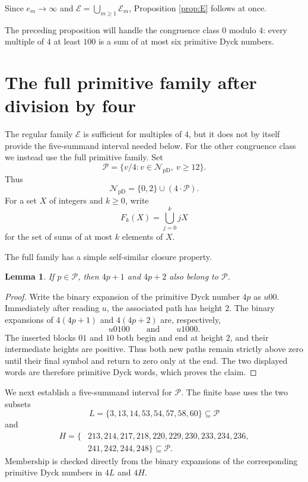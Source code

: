 \documentclass[12pt]{article}
\theoremstyle{plain}
\newtheorem{lemma}[theorem]{Lemma}
\newcommand{\NpD}{\mathcal{N}_{\mathrm{pD}}}
\newcommand{\Pset}{\mathcal P}
\begin{document}
Since $e_m\to\infty$ and $\mathcal E=\bigcup_{m\geq1}\mathcal E_m$,
Proposition \ref{prop:E} follows at once.

The preceding proposition will handle the congruence class $0$ modulo
$4$: every multiple of $4$ at least $100$ is a sum of at most six
primitive Dyck numbers.

\section{The full primitive family after division by four}

The regular family $\mathcal E$ is sufficient for multiples of $4$, but
it does not by itself provide the five-summand interval needed below.
For the other congruence class we instead use the full primitive family.
Set
\[
 \Pset=\{v/4:v\in\NpD,\ v\geq12\}.
\]
Thus
\[
 \NpD=\{0,2\}\cup(4\cdot\Pset).
\]
For a set $X$ of integers and $k\geq0$, write
\[
 F_k(X)=\bigcup_{j=0}^{k}jX
\]
for the set of sums of at most $k$ elements of $X$.

The full family has a simple self-similar closure property.

\begin{lemma}\label{lem:Pclosure}
If $p\in\Pset$, then $4p+1$ and $4p+2$ also belong to $\Pset$.
\end{lemma}

\begin{proof}
Write the binary expansion of the primitive Dyck number $4p$ as $u00$.
Immediately after reading $u$, the associated path has height $2$.  The
binary expansions of $4(4p+1)$ and $4(4p+2)$ are, respectively,
\[
 u0100\qquad\text{and}\qquad u1000.
\]
The inserted blocks $01$ and $10$ both begin and end at height $2$, and
their intermediate heights are positive.  Thus both new paths remain
strictly above zero until their final symbol and return to zero only at
the end.  The two displayed words are therefore primitive Dyck words,
which proves the claim.
\end{proof}

We next establish a five-summand interval for $\Pset$.  The finite base
uses the two subsets
\[
 L=\{3,13,14,53,54,57,58,60\}\subseteq\Pset
\]
and
\[
\begin{split}
 H=\{&213,214,217,218,220,229,230,233,234,236,\\
     &241,242,244,248\}\subseteq\Pset.
\end{split}
\]
Membership is checked directly from the binary expansions of the
corresponding primitive Dyck numbers in $4L$ and $4H$.
\end{document}
